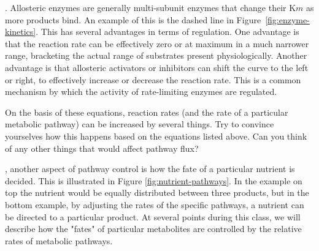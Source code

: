 \documentclass{tufte-handout}
\begin{document}
.  Allosteric enzymes are generally multi-subunit enzymes that change their K${m}$ as more products bind.  An example of this is the dashed line in Figure~\ref{fig:enzyme-kinetics}.  This has several advantages in terms of regulation.  One advantage is that the reaction rate can be effectively zero or at maximum in a much narrower range, bracketing the actual range of substrates present physiologically.  Another advantage is that allosteric activators or inhibitors can shift the curve to the left or right, to effectively increase or decrease the reaction rate.  This is a common mechanism by which the activity of rate-limiting enzymes are regulated.  

On the basis of these equations, reaction rates (and the rate of a particular metabolic pathway) can be increased by several things.  Try to convince yourselves how this happens based on the equations listed above. Can you think of any other things that would affect pathway flux? 

, another aspect of pathway control is how the fate of a particular nutrient is decided.  This is illustrated in Figure \ref{fig:nutrient-pathways}.  In the example on top the nutrient would be equally distributed between three products, but in the bottom example, by adjusting the rates of the specific pathways, a nutrient can be directed to a particular product.  At several points during this class, we will describe how the "fates" of particular metabolites are controlled by the relative rates of metabolic pathways.
\end{document}
